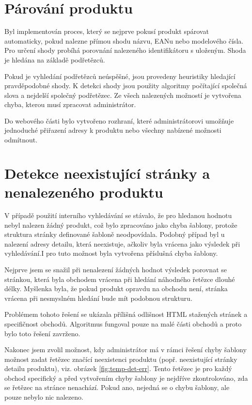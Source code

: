 \documentclass[thesis=B,czech]{FITthesis}[2012/06/26]
\begin{document}
\section{Párování produktu}
Byl implementován proces, který se nejprve pokusí produkt spárovat automaticky, pokud nalezne přímou shodu názvu, EANu nebo modelového čísla.
Pro určení shody probíhá porovnání nalezeného identifikátoru s uloženým. Shoda je hledána na základě podřetězců.
\par
Pokud je vyhledání podřetězců neúspěšné, jsou provedeny heuristiky hledající pravděpodobné shody. K detekci shody jsou použity algoritmy počítající společná slova a nejdelší společný podřetězec. Ze všech nalezených možností je vytvořena chyba, kterou musí zpracovat administrátor.
\par 
Do webového části bylo vytvořeno rozhraní, které administrátorovi umožňuje jednoduché přiřazení adresy k produktu nebo všechny nabízené možnosti odmítnout.


\section{Detekce neexistující stránky a nenalezeného produktu}
V případě použití interního vyhledávání se stávalo, že pro hledanou hodnotu nebyl nalezen žádný produkt, což bylo zpracováno
jako chyba šablony, protože struktura stránky definované šabloně neodpovídala. Podobný případ byl u nalezení adresy detailu, která neexistuje, ačkoliv byla vrácena jako výsledek při vyhledávání.I pro tuto možnost byla vytvořena příslušná chyba šablony.
\par
Nejprve jsem se snažil při nenalezení žádných hodnot výsledek porovnat se stránkou, která byla obchodem vrácena při hledání náhodného
řetězce dlouhé délky. Myšlenka byla, že pokud produkt opravdu na obchodu není, stránka vrácena při nesmyslném hledání bude mít podobnou strukturu.
\par
Problémem tohoto řešení se ukázala přílišná odlišnost HTML stažených stránek a specifičnost obchodů. Algoritmus fungoval
pouze na malé části obchodů a proto bylo toto řešení zavrženo.
\par
Nakonec jsem zvolil možnost, kdy administrátor má v rámci řešení chyby šablony možnost zadat řetězec značící neexistenci produktu (popř. neexistující stránky detailu produktu), viz. obrázek \ref{fig:temp-det-err}. Tento řetězec je pro každý obchod specifický a před vytvořením chyby šablony je nejdříve zkontrolováno, zda se řetězec na stránce nenachází. Pokud ano, nejedná se o chybu šablony, ale pouze nebylo nic nalezeno.
\end{document}
